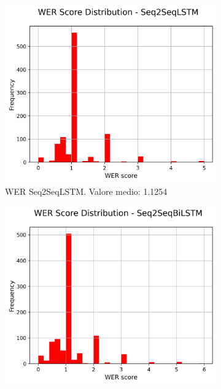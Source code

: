 \documentclass[a4paper, 12pt]{article}
\begin{document}
\begin{figure}[H]
    \centering
    \begin{subfigure}{0.45\textwidth}
        \centering
        \includegraphics[width=\textwidth]{media/Seq2SeqLSTM_wer_scores.png}
        \caption{WER Seq2SeqLSTM. Valore medio: 1.1254}
    \end{subfigure}
    \hfill
    \begin{subfigure}{0.45\textwidth}
        \centering
        \includegraphics[width=\textwidth]{media/Seq2SeqBiLSTM_wer_scores.png}

\end{subfigure}
\end{figure}
\end{document}
